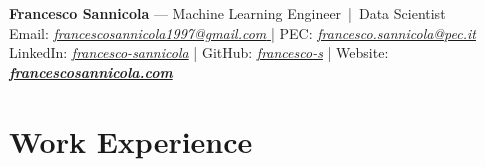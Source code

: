 \documentclass[11pt,a4paper]{article}
\let\OldHref\href
\renewcommand{\href}[2]{\OldHref{#1}{\textit{#2}}}
\begin{document}
	
	\begin{center}
		{\Large \textbf{Francesco Sannicola} — Machine Learning Engineer \,|\, Data Scientist}\\
		Email: \href{mailto:francescosannicola1997@gmail.com}{francescosannicola1997@gmail.com } |
		PEC: \href{mailto:francesco.sannicola@pec.it}{francesco.sannicola@pec.it} \\
		LinkedIn: \href{https://www.linkedin.com/in/francesco-sannicola}{francesco-sannicola} | 
		GitHub: \href{https://github.com/francesco-s}{francesco-s} | 
		Website: \href{https://francescosannicola.com}{\textbf{francescosannicola.com }}
	\end{center}
	
	\vspace{6pt} %
	
	\section*{Work Experience}
	
\end{document}
